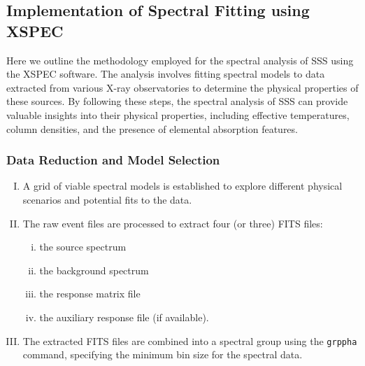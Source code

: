 		\subsection{Implementation of Spectral Fitting using XSPEC}
			Here we outline the methodology employed for the spectral analysis of SSS using the XSPEC software. The analysis involves fitting spectral models to data extracted from various X-ray observatories to determine the physical properties of these sources. By following these steps, the spectral analysis of SSS can provide valuable insights into their physical properties, including effective temperatures, column densities, and the presence of elemental absorption features.
			
			\subsubsection{Data Reduction and Model Selection}
				\begin{enumerate}[I.]
					\item A grid of viable spectral models is established to explore different physical scenarios and potential fits to the data.
					\item The raw event files are processed to extract four (or three) FITS files:
					\begin{enumerate}[i.]
						\item the source spectrum
						\item the background spectrum
						\item the response matrix file
						\item the auxiliary response file (if available).
					\end{enumerate}
					\item The extracted FITS files are combined into a spectral group using the \texttt{grppha} command, specifying the minimum bin size for the spectral data.
				\end{enumerate}
			
